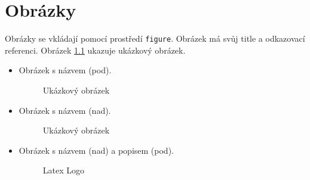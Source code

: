 \chapter{Obrázky}

Obrázky se vkládají pomocí prostředí \texttt{figure}. Obrázek má svůj title a odkazovací referenci. Obrázek \ref{fig:obrazek} ukazuje ukázkový obrázek.

\begin{itemize}
    \item Obrázek s názvem (pod).
    \begin{figure}[ht]
        \centering
        \caption{Ukázkový obrázek}
        \label{fig:obrazek}
    \end{figure}

    \item Obrázek s názvem (nad).
    \begin{figure}[ht]
        \centering
        \caption{Ukázkový obrázek}
        \label{fig:obrazek1}
    \end{figure}

    \item Obrázek s názvem (nad) a popisem (pod).
    \begin{figure}[ht]
        \centering
        \caption{Latex Logo}
        \par\medskip
        \label{fig:obrazek2}
    \end{figure}


\end{itemize}
